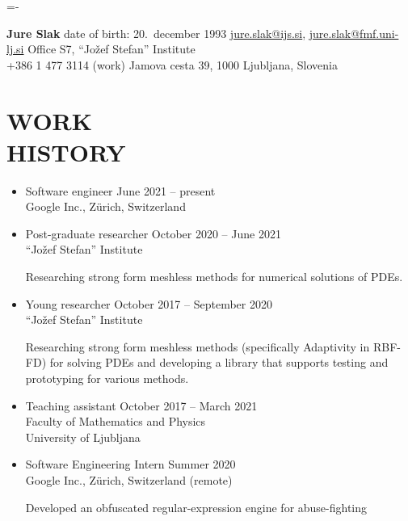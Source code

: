 \documentclass[line,margin]{res}
\newcommand{\wmeta}[1]{\sf#1\rm}
\newcommand{\wdesc}[1]{

#1

\vspace{6pt}}
\begin{document}
\leftskip=-\hoffset
\advance\textwidth\hoffset %
\parindent=0pt
\parskip=2pt

{\bf \large Jure Slak} \hfill date of birth: 20.~december 1993
\vskip 2pt
\fullline
\href{mailto:jure.slak@ijs.si}{jure.slak@ijs.si},
\href{mailto:jure.slak@fmf.uni-lj.si}{jure.slak@fmf.uni-lj.si}
\hfill Office S7, ``Jožef Stefan'' Institute   \\
+386 1 477 3114 (work) \hfill Jamova cesta 39, 1000 Ljubljana, Slovenia

\leftskip=0pt
\parskip=12pt

\section{WORK \\ HISTORY}
\begin{itemize}
  \item \wmeta{Software engineer \hfill June 2021 -- present \\
    \hspace*{\fill} Google Inc., Z\"urich, Switzerland}
  \item \wmeta{Post-graduate researcher \hfill October 2020 -- June 2021 \\
  \hspace*{\fill} ``Jožef Stefan'' Institute}
\wdesc{Researching strong form meshless methods for numerical solutions of
PDEs.}
  \item \wmeta{Young researcher \hfill October 2017 -- September 2020 \\
    \hspace*{\fill} ``Jožef Stefan'' Institute}
  \wdesc{Researching strong form meshless methods (specifically Adaptivity in
  RBF-FD) for solving PDEs
    and developing a library that supports testing and prototyping for various
    methods.}
  \item \wmeta{Teaching assistant \hfill October 2017 -- March 2021 \\
    \hspace*{\fill}  Faculty of Mathematics and Physics \\
    \hspace*{\fill} University of Ljubljana}
    \item \wmeta{Software Engineering Intern \hfill Summer 2020 \\
    \hspace*{\fill} Google Inc., Z\"urich, Switzerland (remote)}
  \wdesc{Developed an obfuscated regular-expression engine for abuse-fighting
}
\end{itemize}
\end{document}
